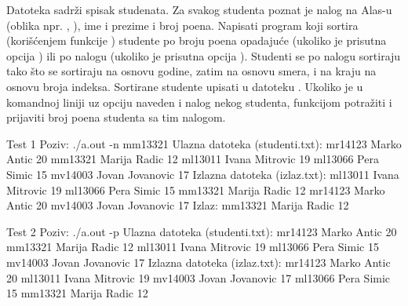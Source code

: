 \begin{Answer}[ref=523]
\end{Answer}
\begin{Exercise}[label=524]
  Datoteka  sadrži spisak studenata. Za svakog
  studenta poznat je nalog na Alas-u (oblika npr. ,
  ), ime i prezime i broj poena. Napisati program koji
  sortira (korišćenjem funkcije ) studente po broju poena
  opadajuće (ukoliko je prisutna opcija ) ili po nalogu
  (ukoliko je prisutna opcija ). Studenti se po nalogu
  sortiraju tako što se sortiraju na osnovu godine, zatim na osnovu
  smera, i na kraju na osnovu broja indeksa. Sortirane studente
  upisati u datoteku . Ukoliko je u komandnoj liniji
  uz opciju  naveden i nalog nekog studenta, funkcijom
   potražiti i prijaviti broj poena studenta sa tim
  nalogom.
  
\begin{miditest}
\begin{test}{Test 1}
Poziv: ./a.out -n mm13321
Ulazna datoteka (studenti.txt):
  mr14123 Marko Antic 20
  mm13321 Marija Radic 12
  ml13011 Ivana Mitrovic 19
  ml13066 Pera Simic 15
  mv14003 Jovan Jovanovic 17
Izlazna datoteka (izlaz.txt):
  ml13011 Ivana Mitrovic 19
  ml13066 Pera Simic 15
  mm13321 Marija Radic 12
  mr14123 Marko Antic 20
  mv14003 Jovan Jovanovic 17
Izlaz:
  mm13321 Marija Radic 12
\end{test}
\end{miditest}
\begin{miditest}
\begin{test}{Test 2}
Poziv: ./a.out -p
Ulazna datoteka (studenti.txt):
  mr14123 Marko Antic 20
  mm13321 Marija Radic 12
  ml13011 Ivana Mitrovic 19
  ml13066 Pera Simic 15
  mv14003 Jovan Jovanovic 17
Izlazna datoteka (izlaz.txt):
  mr14123 Marko Antic 20
  ml13011 Ivana Mitrovic 19
  mv14003 Jovan Jovanovic 17
  ml13066 Pera Simic 15
  mm13321 Marija Radic 12
\end{test}
\end{miditest}
  
\end{Exercise}

